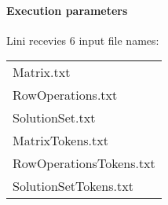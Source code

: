 \documentclass{article}
\begin{document}
\paragraph{Execution parameters}
Lini recevies $6$ input file names:
\begin{table}[h]
\centering
\begin{tabular}{ l }
  Matrix.txt              \\
  RowOperations.txt       \\
  SolutionSet.txt         \\
  MatrixTokens.txt        \\
  RowOperationsTokens.txt \\
  SolutionSetTokens.txt   \\
\end{tabular}
\end{table}
\end{document}
